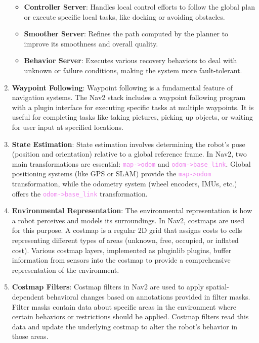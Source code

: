 \begin{enumerate}
\begin{itemize}
        \item \textbf{Controller Server}: Handles local control efforts to follow the global plan or execute specific local tasks, like docking or avoiding obstacles.
        
        \item \textbf{Smoother Server}: Refines the path computed by the planner to improve its smoothness and overall quality.
        
        \item \textbf{Behavior Server}: Executes various recovery behaviors to deal with unknown or failure conditions, making the system more fault-tolerant.
    \end{itemize}

    \item \textbf{Waypoint Following}: Waypoint following is a fundamental feature of navigation systems. The Nav2 stack includes a waypoint following program with a plugin interface for executing specific tasks at multiple waypoints. It is useful for completing tasks like taking pictures, picking up objects, or waiting for user input at specified locations.

    \item \textbf{State Estimation}: State estimation involves determining the robot's pose (position and orientation) relative to a global reference frame. In Nav2, two main transformations are essential: \textcolor{Violet}{\texttt{map->odom}} and \textcolor{Violet}{\texttt{odom->base\_link}}. Global positioning systems (like GPS or SLAM) provide the \textcolor{Violet}{\texttt{map->odom}} transformation, while the odometry system (wheel encoders, IMUs, etc.) offers the \textcolor{Violet}{\texttt{odom->base\_link}} transformation.

    \item \textbf{Environmental Representation}: The environmental representation is how a robot perceives and models its surroundings. In Nav2, costmaps are used for this purpose. A costmap is a regular 2D grid that assigns costs to cells representing different types of areas (unknown, free, occupied, or inflated cost). Various costmap layers, implemented as pluginlib plugins, buffer information from sensors into the costmap to provide a comprehensive representation of the environment.

    \item \textbf{Costmap Filters}: Costmap filters in Nav2 are used to apply spatial-dependent behavioral changes based on annotations provided in filter masks. Filter masks contain data about specific areas in the environment where certain behaviors or restrictions should be applied. Costmap filters read this data and update the underlying costmap to alter the robot's behavior in those areas.
    
\end{enumerate}

